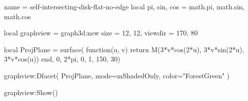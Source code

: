 \documentclass{standalone}
\begin{document}
\begin{luadraw}{name = self-intersecting-disk-flat-no-edge}
local pi, sin, cos = math.pi, math.sin, math.cos

local graphview = graph3d:new{
  size    = {12, 12},
  viewdir = {170, 80}
}

local ProjPlane =  surface(
  function(u, v)
    return M(3*v*cos(2*u), 3*v*sin(2*u), 3*v*cos(u))
  end,
  0, 2*pi, 0, 1,
  {150, 30})

graphview:Dfacet(
  ProjPlane,
  {
    mode=mShadedOnly,
    color="ForestGreen"
  })

graphview:Show()
\end{luadraw}
\end{document}
